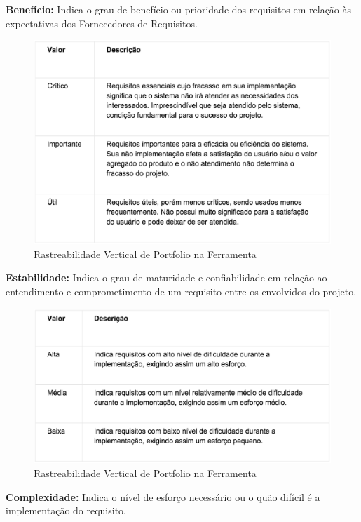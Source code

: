 \textbf{Benefício:} Indica o grau de benefício ou prioridade dos requisitos em relação às
expectativas dos Fornecedores de Requisitos.

\begin{figure}[H]
    \centering
	\includegraphics[keepaspectratio=true,scale=0.5]{figuras/atr1.eps}
    \caption{ Rastreabilidade Vertical de Portfolio na Ferramenta}
    \label{fig:ras}
\end{figure}

\textbf{Estabilidade:} Indica o grau de maturidade e confiabilidade em relação ao entendimento
e comprometimento de um requisito entre os envolvidos do projeto.

\begin{figure}[H]
    \centering
	\includegraphics[keepaspectratio=true,scale=0.5]{figuras/atr3.eps}
    \caption{ Rastreabilidade Vertical de Portfolio na Ferramenta}
    \label{fig:ras}
\end{figure}

\textbf{Complexidade:} Indica o nível de esforço necessário ou o quão difícil é a implementação do requisito.

